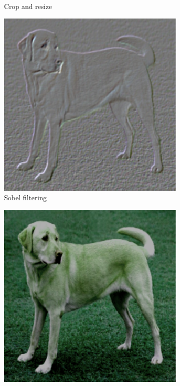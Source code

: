 \begin{figure}[t]
\begin{subfigure}{.19\textwidth}
  \caption{Crop and resize}
\end{subfigure}\begin{subfigure}{.19\textwidth}
  \centering
  \includegraphics[width=0.9\linewidth]{chapters/assets/ssl_figs/transforms/img_sobel.pdf}
  \caption{Sobel filtering}
\end{subfigure}\begin{subfigure}{.19\textwidth}
  \centering
  \includegraphics[width=0.9\linewidth]{chapters/assets/ssl_figs/transforms/img_color1.pdf}

\end{subfigure}
\end{figure}
